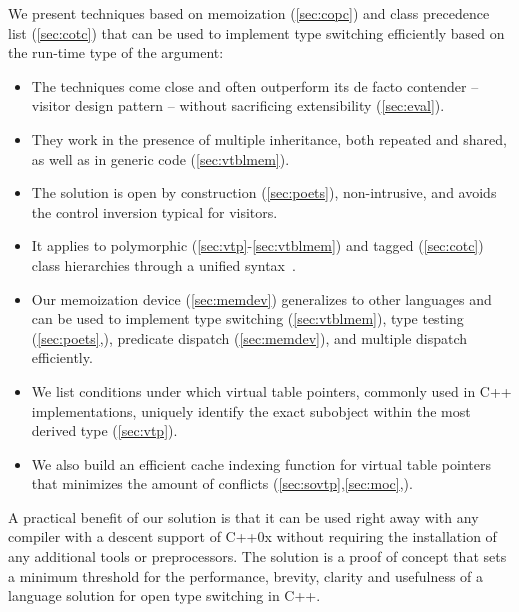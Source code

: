We present techniques based on memoization (\textsection\ref{sec:copc}) and 
class precedence list (\textsection\ref{sec:cotc}) that can be used to
implement type switching efficiently based on the run-time type of the
argument:
  \begin{itemize}
  \setlength{\itemsep}{0pt}
  \setlength{\parskip}{0pt}
  \item The techniques come close and often outperform its de facto contender -- 
        visitor design pattern -- without sacrificing extensibility (\textsection\ref{sec:eval}).
  \item They work in the presence of multiple inheritance, both repeated and 
  shared, as well as in generic code (\textsection\ref{sec:vtblmem}).
  \item The solution is open by construction (\textsection\ref{sec:poets}), 
        non-intrusive, and avoids the control inversion typical for visitors.
  \item It applies to polymorphic (\textsection\ref{sec:vtp}-\ref{sec:vtblmem}) and 
        tagged (\textsection\ref{sec:cotc}) class hierarchies through a unified  
        syntax~\cite{TR}.
  \item Our memoization device (\textsection\ref{sec:memdev}) generalizes to 
        other languages and can be used to implement type switching 
        (\textsection\ref{sec:vtblmem}), type testing 
        (\textsection\ref{sec:poets},\cite[]{TR}), predicate dispatch 
        (\textsection\ref{sec:memdev}), and multiple dispatch efficiently.
  \item We list conditions under which virtual table pointers, commonly used in 
        C++ implementations, uniquely identify the exact subobject within the 
        most derived type (\textsection\ref{sec:vtp}).
  \item We also build an efficient cache indexing function for virtual table 
        pointers that minimizes the amount of conflicts 
        (\textsection\ref{sec:sovtp},\ref{sec:moc},\cite[.5]{TR}).
  \end{itemize}

\noindent
A practical benefit of our solution is that it can be used right away with any 
compiler with a descent support of C++0x without requiring the installation of 
any additional tools or preprocessors. The solution is a proof of concept that 
sets a minimum threshold for the performance, brevity, clarity and usefulness of 
a language solution for open type switching in C++.

